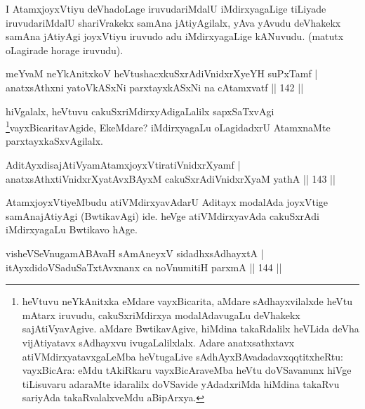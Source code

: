 \begin{artha}
I AtamxjoyxVtiyu deVhadoLage iruvudariMdalU iMdirxyagaLige tiLiyade iruvudariMdalU shariVrakekx samAna jAtiyAgilalx, yAva yAvudu deVhakekx samAna jAtiyAgi  joyxVtiyu iruvudo adu iMdirxyagaLige kANuvudu. (matutx oLagirade horage iruvudu).
\end{artha}


\begin{shl}
meYvaM neYkAnitxkoV heVtushacxkuSxrAdiVnidxrXyeYH suPxTamf | \\
anatxsAthxni yatoV\s kASxNi parxtayxkASxNi na cA\s \s tamxvatf \hfill||  142 ||  
\end{shl}

\begin{artha}
hiVgalalx, heVtuvu cakuSxriMdirxyAdigaLalilx sapxSaTxvAgi \footnote{heVtuvu neYkAnitxka eMdare vayxBicarita, aMdare sAdhayxvilalxde heVtu mAtarx iruvudu, cakuSxriMdirxya modalAdavugaLu deVhakekx sajAtiVyavAgive. aMdare BwtikavAgive, hiMdina takaRdalilx heVLida deVha vijAtiyatavx sAdhayxvu ivugaLalilxlalx. Adare anatxsathxtavx atiVMdirxyatavxgaLeMba heVtugaLive sAdhAyxBAvadadavxqqtitxheRtu: vayxBicAra: eMdu tAkiRkaru vayxBicAraveMba heVtu doVSavanunx hiVge tiLisuvaru adaraMte idaralilx doVSavide yAdadxriMda hiMdina takaRvu sariyAda takaRvalalxveMdu aBipArxya.}vayxBicaritavAgide, EkeMdare? iMdirxyagaLu oLagidadxrU AtamxnaMte parxtayxkaSxvAgilalx.
\end{artha}


\begin{shl}
AditAyxdisajAtiVyamAtamxjoyxVtiratiVnidxrXyamf | \\
anatxsAthxtiVnidxrXyatAvxBAyxM cakuSxrAdiVnidxrXyaM yathA \hfill||  143 ||  
\end{shl}

\begin{artha}
AtamxjoyxVtiyeMbudu atiVMdirxyavAdarU Aditayx modalAda joyxVtige samAnajAtiyAgi (BwtikavAgi) ide. heVge atiVMdirxyavAda cakuSxrAdi iMdirxyagaLu Bwtikavo hAge.
\end{artha}


\begin{shl}
visheVSeV\s nugamABAvaH sAmAneyxV sidadhxsAdhayxtA | \\
itAyxdidoVSaduSaTxtAvxnanx ca noV\s numitiH parxmA \hfill||  144 ||  
\end{shl}

